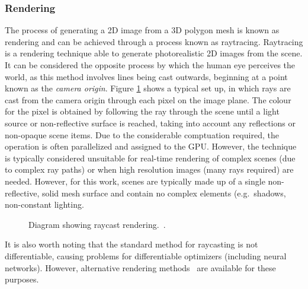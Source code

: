         \subsubsection{Rendering}
        The process of generating a 2D image from a 3D polygon mesh is known as rendering and can be achieved through a process known as raytracing. Raytracing is a rendering technique able to generate photorealistic 2D images from the scene. It can be considered the opposite process by which the human eye perceives the world, as this method involves lines being cast outwards, beginning at a point known as the \emph{camera origin}. Figure \ref{fig:raycasting} shows a typical set up, in which rays are cast from the camera origin through each pixel on the image plane. The colour for the pixel is obtained by following the ray through the scene until a light source or non-reflective surface is reached, taking into account any reflections or non-opaque scene items. Due to the considerable comptuation required, the operation is often parallelized and assigned to the GPU. However, the technique is typically considered unsuitable for real-time rendering of complex scenes (due to complex ray paths) or when high resolution images (many rays required) are needed. However, for this work, scenes are typically made up of a single non-reflective, solid mesh surface and contain no complex elements (e.g.\ shadows, non-constant lighting.

        \begin{figure}[H] %
            \caption{Diagram showing raycast rendering.~\cite{rendering}.}
            \label{fig:raycasting}
        \end{figure}

        It is also worth noting that the standard method for raycasting is not differentiable, causing problems for differentiable optimizers (including neural networks). However, alternative rendering methods~\cite{loper2014opendr} are available for these purposes.

